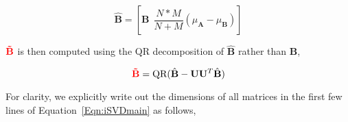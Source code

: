 \begin{equation}
\hat{\mathbf{B}}=\left[\mathbf{B} \ \ \frac{N*M}{N+M}(\mu_\mathbf{A}-\mu_\mathbf{B})\right]
\end{equation}

${\color{red}\mathbf{\tilde{B}}}$ is then computed using the QR decomposition of $\hat{\mathbf{B}}$ rather than $\mathbf{B}$,

\begin{equation}
{\color{red}\mathbf{\tilde{B}}}=\textrm{QR}(\hat{\mathbf{B}} - \mathbf{U}\mathbf{U}^T\hat{\mathbf{B}})
\end{equation}



For clarity, we explicitly write out the dimensions of all matrices in the first few lines of Equation~\ref{Eqn:iSVDmain} as follows,

